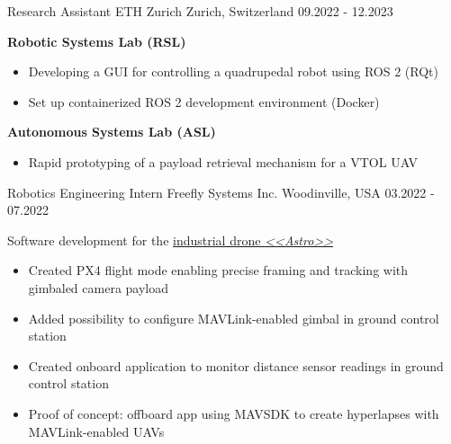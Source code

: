 \vspace{-2.5mm}  

\begin{cvskills}

    \cventry
    {Research Assistant}
    {ETH Zurich}
    {Zurich, Switzerland}
    {09.2022 - 12.2023}
    {
    \begin{cvitems}
        \item \textbf{Robotic Systems Lab (RSL)}
        \begin{itemize}
        \item Developing a GUI for controlling a quadrupedal robot using ROS 2 (RQt)
        \item Set up containerized ROS 2 development environment (Docker)
        \end{itemize}
        \item \textbf{Autonomous Systems Lab (ASL)}
        \begin{itemize}
        \item Rapid prototyping of a payload retrieval mechanism for a VTOL UAV
        \end{itemize}
    \end{cvitems}
    }

    \cventry
    {Robotics Engineering Intern}
    {Freefly Systems Inc.}
    {Woodinville, USA}
    {03.2022 - 07.2022}
    {\begin{cvitems}
        \item Software development for the \href{https://freeflysystems.com/astro}{industrial drone \textit{<<Astro>>} \ExternalLink}
        \begin{itemize}
            \item Created PX4 flight mode enabling precise framing and tracking with gimbaled camera payload
            \item Added possibility to configure MAVLink-enabled gimbal in ground control station
            \item Created onboard application to monitor distance sensor readings in ground control station
            \item Proof of concept: offboard app using MAVSDK to create hyperlapses with MAVLink-enabled UAVs
        \end{itemize}
    \end{cvitems}
    }


\end{cvskills}
